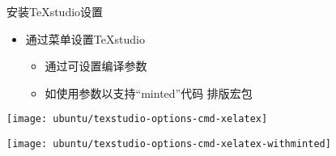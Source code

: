 \documentclass[fontset = none, t]{ctexbeamer}
\begin{document}
\begin{frame}{安装TeXstudio}{设置}
  \begin{spacing}{1.5}
    \begin{itemize}
    \item 通过菜单设置TeXstudio%
      \begin{itemize}
      \item 通过可设置\alert{编译参数}
      \item 如使用参数以支持\enquote{minted}代码
        排版宏包
      \end{itemize}
    \end{itemize}
    \begin{center}
      \begin{annotatedFigure}
        {\texttt{[image: ubuntu/texstudio-options-cmd-xelatex]}}
      \end{annotatedFigure}
      \begin{annotatedFigure}
        {\texttt{[image: ubuntu/texstudio-options-cmd-xelatex-withminted]}}
      \end{annotatedFigure} 
    \end{center}
  \end{spacing}
\end{frame}
\end{document}
